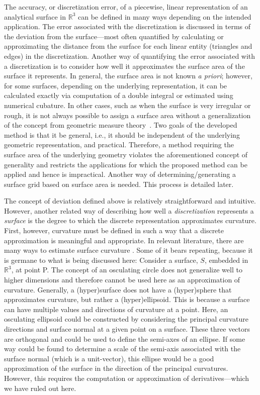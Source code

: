 The accuracy, or discretization error, of a piecewise, linear
representation of an analytical surface in ${\mathbb R}^3$ can be
defined in many ways depending on the intended application. The error
associated with the discretization is discussed in terms of the
deviation from the surface---most often quantified by calculating or
approximating the distance from the surface for each linear entity
(triangles and edges) in the discretization.  Another way of quantifying
the error associated with a discretization is to consider how well
it approximates the surface area of the surface it represents.  In
general, the surface area is not known {\it a priori}; however, for some
surfaces, depending on the underlying representation, it can be 
calculated exactly via computation of a double integral or estimated using 
numerical cubature.  In other cases, such as when the surface is very 
irregular or rough, it is not always possible to assign a surface area
without a generalization of the concept from geometric measure 
theory~\cite{gmt}.  Two goals of the developed 
method is that it be general, i.e., it 
should be independent of the underlying geometric representation, and 
practical.  Therefore, a method requiring the surface area of the 
underlying geometry violates the aforementioned concept of 
generality and restricts the applications for which the proposed method 
can be applied and hence is impractical.  Another way of 
determining/generating a surface grid based on surface area is needed. 
This process is detailed later.

The concept of deviation defined above is relatively straightforward and
intuitive. However, another related way of describing how well a
\textit{discretization} represents a \textit{surface} is the degree to
which the discrete representation approximates curvature. First,
however, curvature must be defined in such a way that a discrete
approximation is meaningful and appropriate. In relevant literature,
there are many ways to estimate surface curvature \cite{hermann07}. Some
of it bears repeating, because it is germane to what is being discussed
here: Consider a surface, $S$, embedded in ${\mathbb R}^3$, at point P.
The concept of an osculating circle \cite{weissteineOsculatingCircle}
does not generalize well to higher dimensions and therefore cannot be
used here as an approximation of curvature. Generally, a (hyper)surface
does not have a (hyper)sphere that approximates curvature, but rather a
(hyper)ellipsoid. This is because a surface can have multiple values and
directions of curvature at a point. Here, an osculating ellipsoid could
be constructed by considering the principal curvature directions and
surface normal at a given point on a surface. These three vectors are
orthogonal and could be used to define the semi-axes of an ellipse. If
some way could be found to determine a scale of the semi-axis associated
with the surface normal (which is a unit-vector), this ellipse would be
a good approximation of the surface in the direction of the principal
curvatures. However, this requires the computation or approximation of
derivatives---which we have ruled out here.

